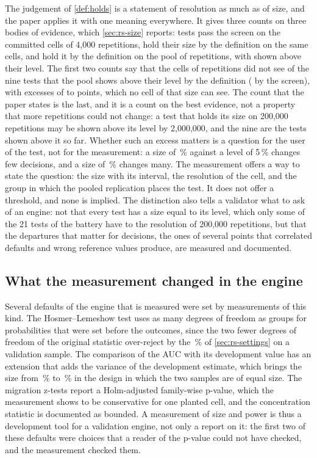 The judgement of \cref{def:holds} is a statement of resolution as much as of size, and the paper applies it with one meaning everywhere.
It gives three counts on three bodies of evidence, which \cref{sec:rs-size} reports: \nHoldCellRule{} tests pass the screen on the committed cells of 4,000 repetitions, \nHoldCellDef{} hold their size by the definition on the same cells, and \nHold{} hold it by the definition on the pool of \nRepsPooled{} repetitions, with \nNotHold{} shown above their level.
The first two counts say that the cells of \nNullReps{} repetitions did not see \nMissedByCell{} of the nine tests that the pool shows above their level by the definition (\nMissedByCellRule{} by the screen), with excesses of \smallExcMin{} to \smallExcMax{} points, which no cell of that size can see.
The count that the paper states is the last, and it is a count on the best evidence, not a property that more repetitions could not change: a test that holds its size on 200,000 repetitions may be shown above its level by 2,000,000, and the nine are the tests shown above it so far.
Whether such an excess matters is a question for the user of the test, not for the measurement: a size of \pooledPsi\,\% against a level of 5\,\% changes few decisions, and a size of \pooledNorm\,\% changes many.
The measurement offers a way to state the question: the size with its interval, the resolution of the cell, and the group in which the pooled replication places the test.
It does not offer a threshold, and none is implied. The distinction also tells a validator what to ask of an engine: not that every test has a size equal to its level, which only some of the 21 tests of the battery have to the resolution of 200,000 repetitions, but that the departures that matter for decisions, the ones of several points that correlated defaults and wrong reference values produce, are measured and documented.

\subsection{What the measurement changed in the engine}
\label{sec:di-engine}

Several defaults of the engine that is measured were set by measurements of this kind.
The Hosmer--Lemeshow test uses as many degrees of freedom as groups for probabilities that were set before the outcomes, since the two fewer degrees of freedom of the original statistic over-reject by the \hlFitted\,\% of \cref{sec:rs-settings} on a validation sample.
The comparison of the AUC with its development value has an extension that adds the variance of the development estimate, which brings the size from \aucDevOne\,\% to \aucDevOneExt\,\% in the design in which the two samples are of equal size.
The migration z-tests report a Holm-adjusted family-wise p-value, which the measurement shows to be conservative for one planted cell, and the concentration statistic is documented as bounded.
A measurement of size and power is thus a development tool for a validation engine, not only a report on it: the first two of these defaults were choices that a reader of the p-value could not have checked, and the measurement checked them.

